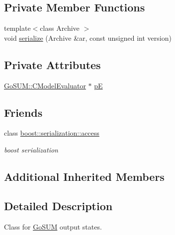 \subsection*{Private Member Functions}
\begin{DoxyCompactItemize}
\item 
{\footnotesize template$<$class Archive $>$ }\\void \hyperlink{class_go_s_u_m_1_1_c_output_states_a02da6bf9a4d7d11010670ab6525d7ac4}{serialize} (Archive \&ar, const unsigned int version)
\end{DoxyCompactItemize}
\subsection*{Private Attributes}
\begin{DoxyCompactItemize}
\item 
\hyperlink{class_go_s_u_m_1_1_c_model_evaluator}{Go\-S\-U\-M\-::\-C\-Model\-Evaluator} $\ast$ \hyperlink{class_go_s_u_m_1_1_c_output_states_ace5684dae11c9a0d432daddd623d8b62}{p\-E}
\end{DoxyCompactItemize}
\subsection*{Friends}
\begin{DoxyCompactItemize}
\item 
class \hyperlink{class_go_s_u_m_1_1_c_output_states_ac98d07dd8f7b70e16ccb9a01abf56b9c}{boost\-::serialization\-::access}
\begin{DoxyCompactList}\small\item\em boost serialization \end{DoxyCompactList}\end{DoxyCompactItemize}
\subsection*{Additional Inherited Members}


\subsection{Detailed Description}
Class for \hyperlink{struct_go_s_u_m}{Go\-S\-U\-M} output states. 

